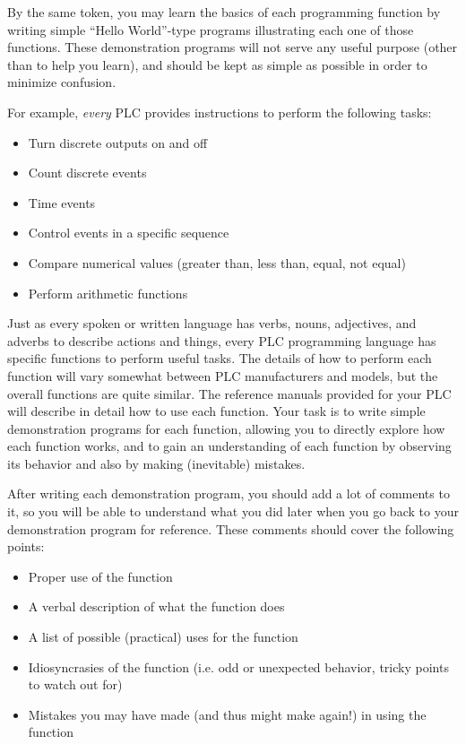 By the same token, you may learn the basics of each programming function by writing simple ``Hello World''-type programs illustrating each one of those functions.  These demonstration programs will not serve any useful purpose (other than to help you learn), and should be kept as simple as possible in order to minimize confusion.

For example, \textit{every} PLC provides instructions to perform the following tasks:

\begin{itemize}
\item Turn discrete outputs on and off
\item Count discrete events
\item Time events
\item Control events in a specific sequence
\item Compare numerical values (greater than, less than, equal, not equal)
\item Perform arithmetic functions
\end{itemize}

Just as every spoken or written language has verbs, nouns, adjectives, and adverbs to describe actions and things, every PLC programming language has specific functions to perform useful tasks.  The details of how to perform each function will vary somewhat between PLC manufacturers and models, but the overall functions are quite similar.  The reference manuals provided for your PLC will describe in detail how to use each function.  Your task is to write simple demonstration programs for each function, allowing you to directly explore how each function works, and to gain an understanding of each function by observing its behavior and also by making (inevitable) mistakes.

After writing each demonstration program, you should add a lot of comments to it, so you will be able to understand what you did later when you go back to your demonstration program for reference.  These comments should cover the following points:

\begin{itemize}
\item Proper use of the function
\item A verbal description of what the function does
\item A list of possible (practical) uses for the function
\item Idiosyncrasies of the function (i.e. odd or unexpected behavior, tricky points to watch out for)
\item Mistakes you may have made (and thus might make again!) in using the function
\end{itemize}

